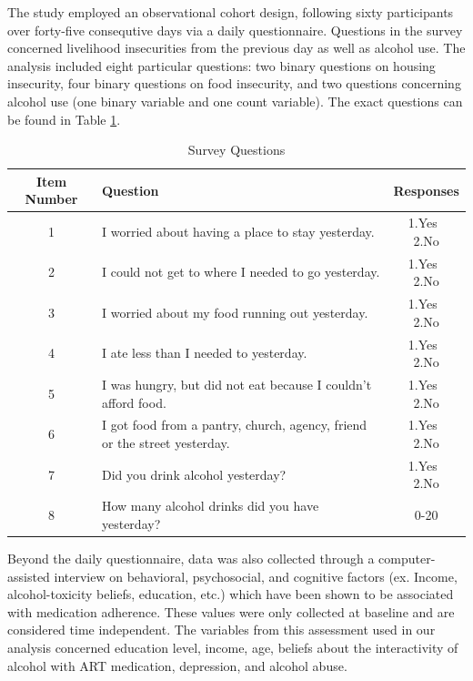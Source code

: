 \documentclass{svjour3}\usepackage[]{graphicx}\usepackage[]{color}
\begin{document}
The study employed an observational cohort design, following sixty participants over forty-five consequtive days via a daily questionnaire. Questions in the survey concerned livelihood insecurities from the previous day as well as alcohol use. The analysis included eight particular questions: two binary questions on housing insecurity, four binary questions on food insecurity, and two questions concerning alcohol use (one binary variable and one count variable). The exact questions can be found in Table \ref{tab:table1}. \par

\begin{table}[t]
	\centering
	\caption{Survey Questions}
	\label{tab:table1}
	\begin{tabular}{cp{6.5cm}c}
		\toprule
		Item Number & Question & Responses\\
		\midrule
		1 & I worried about having a place to stay yesterday. & 1.Yes $\>$ 2.No \\
		2 & I could not get to where I needed to go yesterday. & 1.Yes $\>$ 2.No \\
		3 & I worried about my food running out yesterday. & 1.Yes $\>$ 2.No \\
		4 & I ate less than I needed to yesterday. & 1.Yes $\>$ 2.No \\
		5 & I was hungry, but did not eat because I couldn't afford food. & 1.Yes $\>$ 2.No \\
		6 & I got food from a pantry, church, agency, friend or the street yesterday. & 1.Yes $\>$ 2.No \\
		7 & Did you drink alcohol yesterday? & 1.Yes $\>$ 2.No \\
		8 & How many alcohol drinks did you have yesterday? & 0-20 \\
		\bottomrule
	\end{tabular}
\end{table}

Beyond the daily questionnaire, data was also collected through a computer-assisted interview on behavioral, psychosocial, and cognitive factors (ex. Income, alcohol-toxicity beliefs, education, etc.) which have been shown to be associated with medication adherence. These values were only collected at baseline and are considered time independent. The variables from this assessment used in our analysis concerned education level, income, age, beliefs about the interactivity of alcohol with ART medication, depression, and alcohol abuse. \par
\end{document}
